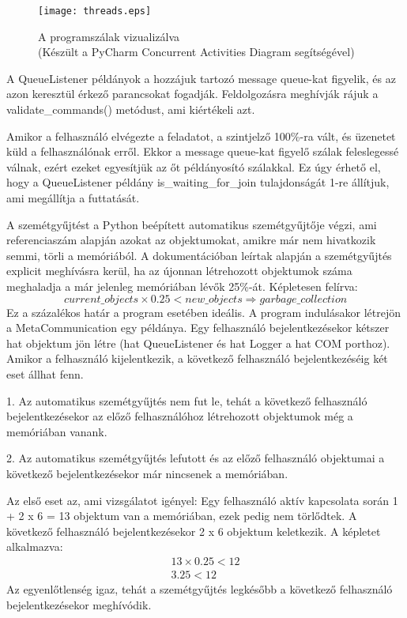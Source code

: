 \documentclass[12pt]{report}
\begin{document}
\begin{figure}[h]
    \centering
    \texttt{[image: threads.eps]}
    \caption{A programszálak vizualizálva\\(Készült a PyCharm Concurrent Activities Diagram segítségével)}
\end{figure}

A QueueListener példányok a hozzájuk tartozó message queue-kat figyelik, és az azon keresztül érkező parancsokat fogadják. Feldolgozásra meghívják rájuk a validate\_commands() metódust, ami kiértékeli azt.


Amikor a felhasználó elvégezte a feladatot, a szintjelző 100\%-ra vált, és üzenetet küld a felhasználónak erről.
Ekkor a message queue-kat figyelő szálak feleslegessé válnak, ezért ezeket egyesítjük az őt példányosító szálakkal. 
Ez úgy érhető el, hogy a QueueListener példány is\_waiting\_for\_join tulajdonságát 1-re állítjuk, ami megállítja a futtatását.


A szemétgyűjtést a Python beépített automatikus szemétgyűjtője végzi, ami referenciaszám alapján azokat az objektumokat, amikre már nem hivatkozik semmi, törli a memóriából.
A dokumentációban leírtak alapján a szemétgyűjtés explicit meghívásra kerül, ha az újonnan létrehozott objektumok száma meghaladja a már jelenleg memóriában lévők 25\%-át.
Képletesen felírva:
\begin{equation}
    current\_objects \times 0.25 < new\_objects \Rightarrow garbage\_collection
\end{equation}
Ez a százalékos határ a program esetében ideális. A program indulásakor létrejön a MetaCommunication egy példánya.
Egy felhasználó bejelentkezésekor kétszer hat objektum jön létre (hat QueueListener és hat Logger a hat COM porthoz).
Amikor a felhasználó kijelentkezik, a következő felhasználó bejelentkezéséig két eset állhat fenn.

1. Az automatikus szemétgyűjtés nem fut le, tehát a következő felhasználó bejelentkezésekor az előző felhasználóhoz létrehozott objektumok még a memóriában vanank.

2. Az automatikus szemétgyűjtés lefutott és az előző felhasználó objektumai a következő bejelentkezésekor már nincsenek a memóriában.

Az első eset az, ami vizsgálatot igényel:
Egy felhasználó aktív kapcsolata során 1 + 2 x 6 = 13 objektum van a memóriában, ezek pedig nem törlődtek.
A következő felhasználó bejelentkezésekor 2 x 6 objektum keletkezik. A képletet alkalmazva:
\begin{align*}
    13 \times 0.25 < 12 \\
    3.25 < 12
\end{align*}
Az egyenlőtlenség igaz, tehát a szemétgyűjtés legkésőbb a következő felhasználó bejelentkezésekor meghívódik.
\end{document}
